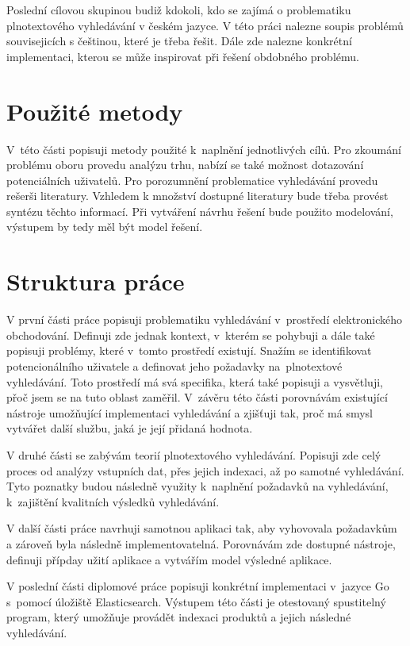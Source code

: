 \documentclass[FM,DP]{tulthesis}
\begin{document}
Poslední cílovou skupinou budiž kdokoli, kdo se zajímá o problematiku plnotextového 
vyhledávání v českém jazyce. V této práci nalezne soupis problémů souvisejicích s češtinou, 
které je třeba řešit. Dále zde nalezne konkrétní implementaci, kterou se může inspirovat 
při řešení obdobného problému.

\section{Použité metody}

V~této části popisuji metody použité k~naplnění jednotlivých cílů. Pro zkoumání problému
oboru provedu analýzu trhu, nabízí se také možnost dotazování potenciálních uživatelů.
Pro porozumnění problematice vyhledávání provedu rešerši literatury. Vzhledem k množství
dostupné literatury bude třeba provést syntézu těchto informací. Při vytváření 
návrhu řešení bude použito modelování, výstupem by tedy měl být model řešení. 

\section{Struktura práce}

V první části práce popisuji problematiku vyhledávání v~prostředí elektronického obchodování. 
Definuji zde jednak kontext, v~kterém se pohybuji a dále také popisuji problémy, 
které v~tomto prostředí existují. Snažím se identifikovat potencionálního uživatele 
a definovat jeho požadavky na~plnotextové vyhledávání. Toto prostředí má svá specifika, 
která také popisuji a vysvětluji, přoč jsem se na tuto oblast zaměřil. V~závěru této části porovnávám
existující nástroje umožňující implementaci vyhledávání a zjišťuji tak, proč má smysl
vytvářet další službu, jaká je její přidaná hodnota.

V druhé části se zabývám teorií plnotextového vyhledávání. Popisuji zde celý
proces od analýzy vstupních dat, přes jejich indexaci, až po samotné vyhledávání. 
Tyto poznatky budou následně využity k~naplnění požadavků na vyhledávání, k~zajištění
kvalitních výsledků vyhledávání.

V další části práce navrhuji samotnou aplikaci tak, aby vyhovovala požadavkům a zároveň byla 
následně implementovatelná. Porovnávám zde dostupné nástroje, definuji přípday užití aplikace
a vytvářím model výsledné aplikace.

V poslední části diplomové práce popisuji konkrétní implementaci v~jazyce Go s~pomocí úložiště 
Elasticsearch. Výstupem této části je otestovaný spustitelný program, který umožňuje provádět 
indexaci produktů a jejich následné vyhledávání.
\end{document}
